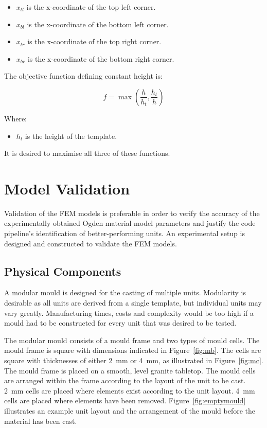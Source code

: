\begin{itemize}
	\item $x_{tl}$ is the x-coordinate of the top left corner.
	\item $x_{bl}$ is the x-coordinate of the bottom left corner.
	\item $x_{tr}$ is the x-coordinate of the top right corner.
	\item $x_{br}$ is the x-coordinate of the bottom right corner.
\end{itemize}

The objective function defining constant height is:

\begin{equation}
	f=\max\left (\frac{h}{h_{t}},\frac{h_{t}}{h} \right )
\end{equation}

Where:

\begin{itemize}
	\item $h_{t}$ is the height of the template.
\end{itemize}

It is desired to maximise all three of these functions.

\section{Model Validation}
\label{sec:MV}

Validation of the FEM models is preferable in order to verify the accuracy of the experimentally obtained Ogden material model parameters and justify the code pipeline's identification of better-performing units. An experimental setup is designed and constructed to validate the FEM models.

\subsection{Physical Components}
\label{ssec:pc}

A modular mould is designed for the casting of multiple units. Modularity is desirable as all units are derived from a single template, but individual units may vary greatly. Manufacturing times, costs and complexity would be too high if a mould had to be constructed for every unit that was desired to be tested.

The modular mould consists of a mould frame and two types of mould cells. The mould frame is square with dimensions indicated in Figure~\ref{fig:mb}. The cells are square with thicknesses of either \SI{2}{mm} or \SI{4}{mm}, as illustrated in Figure~\ref{fig:mc}. The mould frame is placed on a smooth, level granite tabletop. The mould cells are arranged within the frame according to the layout of the unit to be cast. \SI{2}{mm} cells are placed where elements exist according to the unit layout. \SI{4}{mm} cells are placed where elements have been removed. Figure~\ref{fig:emptymould} illustrates an example unit layout and the arrangement of the mould before the material has been cast.

